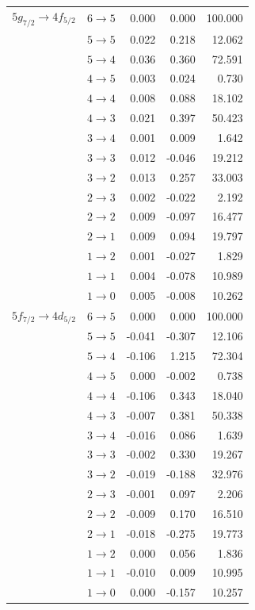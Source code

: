 \begin{longtable}{cc|rrr}
$5g_{7/2} \rightarrow 4f_{5/2}$  &  $6 \rightarrow 5$  &  0.000  &  0.000  &  100.000\\
&  $5 \rightarrow 5$  &  0.022  &  0.218  &  12.062\\
&  $5 \rightarrow 4$  &  0.036  &  0.360  &  72.591\\
&  $4 \rightarrow 5$  &  0.003  &  0.024  &  0.730\\
&  $4 \rightarrow 4$  &  0.008  &  0.088  &  18.102\\
&  $4 \rightarrow 3$  &  0.021  &  0.397  &  50.423\\
&  $3 \rightarrow 4$  &  0.001  &  0.009  &  1.642\\
&  $3 \rightarrow 3$  &  0.012  &  -0.046  &  19.212\\
&  $3 \rightarrow 2$  &  0.013  &  0.257  &  33.003\\
&  $2 \rightarrow 3$  &  0.002  &  -0.022  &  2.192\\
&  $2 \rightarrow 2$  &  0.009  &  -0.097  &  16.477\\
&  $2 \rightarrow 1$  &  0.009  &  0.094  &  19.797\\
&  $1 \rightarrow 2$  &  0.001  &  -0.027  &  1.829\\
&  $1 \rightarrow 1$  &  0.004  &  -0.078  &  10.989\\
&  $1 \rightarrow 0$  &  0.005  &  -0.008  &  10.262\\[7pt]

$5f_{7/2} \rightarrow 4d_{5/2}$  &  $6 \rightarrow 5$  &  0.000  &  0.000  &  100.000\\
&  $5 \rightarrow 5$  &  -0.041  &  -0.307  &  12.106\\
&  $5 \rightarrow 4$  &  -0.106  &  1.215  &  72.304\\
&  $4 \rightarrow 5$  &  0.000  &  -0.002  &  0.738\\
&  $4 \rightarrow 4$  &  -0.106  &  0.343  &  18.040\\
&  $4 \rightarrow 3$  &  -0.007  &  0.381  &  50.338\\
&  $3 \rightarrow 4$  &  -0.016  &  0.086  &  1.639\\
&  $3 \rightarrow 3$  &  -0.002  &  0.330  &  19.267\\
&  $3 \rightarrow 2$  &  -0.019  &  -0.188  &  32.976\\
&  $2 \rightarrow 3$  &  -0.001  &  0.097  &  2.206\\
&  $2 \rightarrow 2$  &  -0.009  &  0.170  &  16.510\\
&  $2 \rightarrow 1$  &  -0.018  &  -0.275  &  19.773\\
&  $1 \rightarrow 2$  &  0.000  &  0.056  &  1.836\\
&  $1 \rightarrow 1$  &  -0.010  &  0.009  &  10.995\\
&  $1 \rightarrow 0$  &  0.000  &  -0.157  &  10.257\\[7pt]


\end{longtable}
